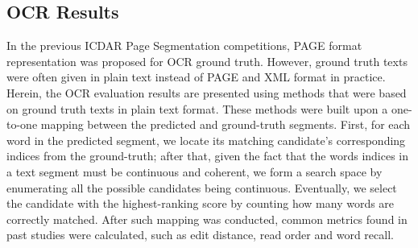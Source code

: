 \documentclass[letterpaper]{article} %
\begin{document}
\subsection{OCR Results}
In the previous ICDAR Page Segmentation competitions, PAGE format representation \cite{DBLP:conf/icdar/ClausnerAP17} was proposed for OCR ground truth. However, ground truth texts were often given in plain text instead of PAGE and XML format in practice. Herein, the OCR evaluation results are presented using methods that were based on ground truth texts in plain text format. These methods were built upon a one-to-one mapping between the predicted and ground-truth segments. First, for each word in the predicted segment, we locate its matching candidate's corresponding indices from the ground-truth; after that, given the fact that the words indices in a text segment must be continuous and coherent, we form a search space by enumerating all the possible candidates being continuous. Eventually, we select the candidate with the highest-ranking score by counting how many words are correctly matched. After such mapping was conducted, common metrics found in past studies were calculated, such as edit distance, read order and word recall.  

\end{document}
